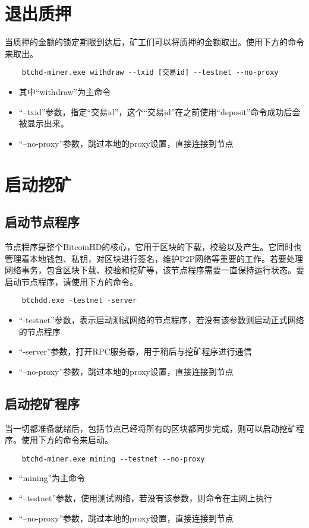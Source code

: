 \section{退出质押}
\begin{flushleft}
    当质押的金额的锁定期限到达后，矿工们可以将质押的金额取出。使用下方的命令来取出。
\end{flushleft}
\scriptsize
\begin{verbatim}
    btchd-miner.exe withdraw --txid [交易id] --testnet --no-proxy
\end{verbatim}
\normalsize
\begin{itemize}
    \item 其中``withdraw''为主命令
    \item ``--txid''参数，指定``交易id''，这个``交易id''在之前使用``deposit''命令成功后会被显示出来。
    \item ``--no-proxy''参数，跳过本地的proxy设置，直接连接到节点
\end{itemize}
\section{启动挖矿}
\subsection{启动节点程序}
\begin{flushleft}
    节点程序是整个BitcoinHD的核心，它用于区块的下载，校验以及产生。它同时也管理着本地钱包、私钥，对区块进行签名，维护P2P网络等重要的工作。若要处理网络事务，包含区块下载、校验和挖矿等，该节点程序需要一直保持运行状态。要启动节点程序，请使用下方的命令。
\end{flushleft}
\scriptsize
\begin{verbatim}
    btchdd.exe -testnet -server
\end{verbatim}
\normalsize
\begin{itemize}
    \item ``-testnet''参数，表示启动测试网络的节点程序，若没有该参数则启动正式网络的节点程序
    \item ``-server''参数，打开RPC服务器，用于稍后与挖矿程序进行通信
    \item ``--no-proxy''参数，跳过本地的proxy设置，直接连接到节点
\end{itemize}
\subsection{启动挖矿程序}
\begin{flushleft}
    当一切都准备就绪后，包括节点已经将所有的区块都同步完成，则可以启动挖矿程序。使用下方的命令来启动。
\end{flushleft}
\scriptsize
\begin{verbatim}
    btchd-miner.exe mining --testnet --no-proxy
\end{verbatim}
\normalsize
\begin{itemize}
    \item ``mining''为主命令
    \item ``--testnet''参数，使用测试网络，若没有该参数，则命令在主网上执行
    \item ``--no-proxy''参数，跳过本地的proxy设置，直接连接到节点
\end{itemize}
